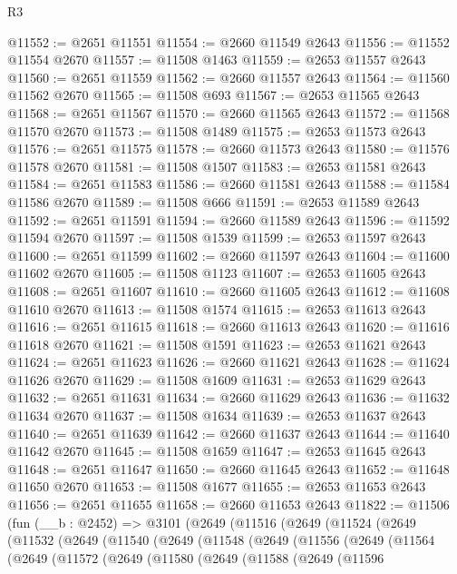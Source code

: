 \begin{lexlean}{R3}
\begin{coremodule}
@11552 := @2651 @11551
@11554 := @2660 @11549 @2643
@11556 := @11552 @11554 @2670
@11557 := @11508 @1463
@11559 := @2653 @11557 @2643
@11560 := @2651 @11559
@11562 := @2660 @11557 @2643
@11564 := @11560 @11562 @2670
@11565 := @11508 @693
@11567 := @2653 @11565 @2643
@11568 := @2651 @11567
@11570 := @2660 @11565 @2643
@11572 := @11568 @11570 @2670
@11573 := @11508 @1489
@11575 := @2653 @11573 @2643
@11576 := @2651 @11575
@11578 := @2660 @11573 @2643
@11580 := @11576 @11578 @2670
@11581 := @11508 @1507
@11583 := @2653 @11581 @2643
@11584 := @2651 @11583
@11586 := @2660 @11581 @2643
@11588 := @11584 @11586 @2670
@11589 := @11508 @666
@11591 := @2653 @11589 @2643
@11592 := @2651 @11591
@11594 := @2660 @11589 @2643
@11596 := @11592 @11594 @2670
@11597 := @11508 @1539
@11599 := @2653 @11597 @2643
@11600 := @2651 @11599
@11602 := @2660 @11597 @2643
@11604 := @11600 @11602 @2670
@11605 := @11508 @1123
@11607 := @2653 @11605 @2643
@11608 := @2651 @11607
@11610 := @2660 @11605 @2643
@11612 := @11608 @11610 @2670
@11613 := @11508 @1574
@11615 := @2653 @11613 @2643
@11616 := @2651 @11615
@11618 := @2660 @11613 @2643
@11620 := @11616 @11618 @2670
@11621 := @11508 @1591
@11623 := @2653 @11621 @2643
@11624 := @2651 @11623
@11626 := @2660 @11621 @2643
@11628 := @11624 @11626 @2670
@11629 := @11508 @1609
@11631 := @2653 @11629 @2643
@11632 := @2651 @11631
@11634 := @2660 @11629 @2643
@11636 := @11632 @11634 @2670
@11637 := @11508 @1634
@11639 := @2653 @11637 @2643
@11640 := @2651 @11639
@11642 := @2660 @11637 @2643
@11644 := @11640 @11642 @2670
@11645 := @11508 @1659
@11647 := @2653 @11645 @2643
@11648 := @2651 @11647
@11650 := @2660 @11645 @2643
@11652 := @11648 @11650 @2670
@11653 := @11508 @1677
@11655 := @2653 @11653 @2643
@11656 := @2651 @11655
@11658 := @2660 @11653 @2643
@11822 := @11506
    (fun (__b : @2452) =>
    @3101
      (@2649
        (@11516
          (@2649
            (@11524
              (@2649
                (@11532
                  (@2649
                    (@11540
                      (@2649
                        (@11548
                          (@2649
                            (@11556
                              (@2649
                                (@11564
                                  (@2649
                                    (@11572
                                      (@2649
                                        (@11580
                                          (@2649
                                            (@11588
                                              (@2649
                                                (@11596

\end{coremodule}
\end{lexlean}
